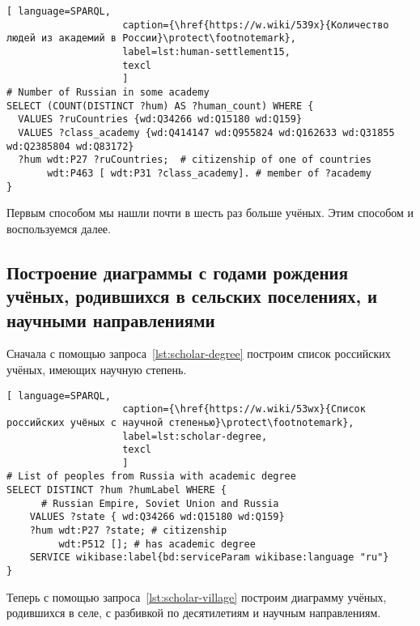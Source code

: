 \begin{lstlisting}[ language=SPARQL, 
                    caption={\href{https://w.wiki/539x}{Количество людей из академий в России}\protect\footnotemark},
                    label=lst:human-settlement15,
                    texcl 
                    ]
# Number of Russian in some academy
SELECT (COUNT(DISTINCT ?hum) AS ?human_count) WHERE {
  VALUES ?ruCountries {wd:Q34266 wd:Q15180 wd:Q159}
  VALUES ?class_academy {wd:Q414147 wd:Q955824 wd:Q162633 wd:Q31855 wd:Q2385804 wd:Q83172}
  ?hum wdt:P27 ?ruCountries;  # citizenship of one of countries
       wdt:P463 [ wdt:P31 ?class_academy]. # member of ?academy
}
\end{lstlisting}%

Первым способом мы нашли почти в шесть раз больше учёных. 
Этим способом и воспользуемся далее. 




\subsection{Построение диаграммы с годами рождения учёных, родившихся в сельских поселениях, и научными направлениями}

Сначала с помощью запроса~\ref{lst:scholar-degree} 
построим список российских учёных, имеющих научную степень.

\begin{lstlisting}[ language=SPARQL, 
                    caption={\href{https://w.wiki/53wx}{Список российских учёных с научной степенью}\protect\footnotemark},
                    label=lst:scholar-degree,
                    texcl 
                    ]
# List of peoples from Russia with academic degree
SELECT DISTINCT ?hum ?humLabel WHERE {
      # Russian Empire, Soviet Union and Russia
    VALUES ?state { wd:Q34266 wd:Q15180 wd:Q159}
    ?hum wdt:P27 ?state; # citizenship
         wdt:P512 []; # has academic degree 
    SERVICE wikibase:label{bd:serviceParam wikibase:language "ru"}
}
\end{lstlisting}%



Теперь с помощью запроса~\ref{lst:scholar-village} 
построим диаграмму учёных, родившихся в селе, с разбивкой по десятилетиям %
и научным направлениям. 

